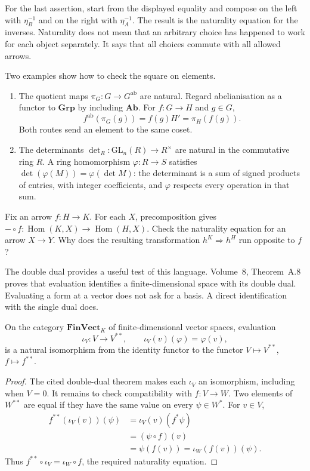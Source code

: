 For the last assertion, start from the displayed equality and compose on the left with $\eta_B^{-1}$ and on the right with $\eta_A^{-1}$. The result is the naturality equation for the inverses. Naturality does not mean that an arbitrary choice has happened to work for each object separately. It says that all choices commute with all allowed arrows.

\begin{example}\label{ex:nattrans}
Two examples show how to check the square on elements.
\begin{enumerate}[label=(\alph*)]
\item The quotient maps $\pi_G:G\to G^{\mathrm{ab}}$ are natural. Regard abelianisation as a functor to $\mathbf{Grp}$ by including $\mathbf{Ab}$. For $f:G\to H$ and $g\in G$,
\[
f^{\mathrm{ab}}(\pi_G(g))=f(g)H'=\pi_H(f(g)).
\]
Both routes send an element to the same coset.
\item The determinants $\det_R:\mathrm{GL}_n(R)\to R^\times$ are natural in the commutative ring $R$. A ring homomorphism $\varphi:R\to S$ satisfies $\det(\varphi(M))=\varphi(\det M)$: the determinant is a sum of signed products of entries, with integer coefficients, and $\varphi$ respects every operation in that sum.
\end{enumerate}
\end{example}

\begin{think}
Fix an arrow $f:H\to K$. For each $X$, precomposition gives $-\circ f:\operatorname{Hom}(K,X)\to\operatorname{Hom}(H,X)$. Check the naturality equation for an arrow $X\to Y$. Why does the resulting transformation $h^K\Rightarrow h^H$ run opposite to $f$?
\end{think}

The double dual provides a useful test of this language. Volume~8, Theorem~A.8 proves that evaluation identifies a finite-dimensional space with its double dual. Evaluating a form at a vector does not ask for a basis. A direct identification with the single dual does.

\begin{theorem}\label{thm:bidualnat}
On the category $\mathbf{FinVect}_K$ of finite-dimensional vector spaces, evaluation
\[
\iota_V:V\longrightarrow V^{**},\qquad\iota_V(v)(\varphi)=\varphi(v),
\]
is a natural isomorphism from the identity functor to the functor $V\mapsto V^{**}$, $f\mapsto f^{**}$.
\end{theorem}

\begin{proof}
The cited double-dual theorem makes each $\iota_V$ an isomorphism, including when $V=0$. It remains to check compatibility with $f:V\to W$. Two elements of $W^{**}$ are equal if they have the same value on every $\psi\in W^*$. For $v\in V$,
\[
\begin{aligned}
f^{**}(\iota_V(v))(\psi)
 &=\iota_V(v)(f^*\psi)\\
 &=(\psi\circ f)(v)\\
 &=\psi(f(v))=\iota_W(f(v))(\psi).
\end{aligned}
\]
Thus $f^{**}\circ\iota_V=\iota_W\circ f$, the required naturality equation.
\end{proof}


